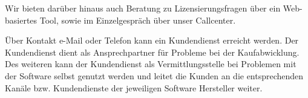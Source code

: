 Wir bieten darüber hinaus auch Beratung zu Lizensierungsfragen über ein Web-basiertes Tool, sowie im Einzelgespräch über unser Callcenter.\\ \medskip


Über Kontakt e-Mail oder Telefon kann ein Kundendienst erreicht werden. Der Kundendienst dient als Ansprechpartner für Probleme bei der Kaufabwicklung. Des weiteren kann der Kundendienst als Vermittlungsstelle bei Problemen mit der Software selbst genutzt werden und leitet die Kunden an die entsprechenden Kanäle bzw.  Kundendienste der jeweiligen Software Hersteller weiter. \\ \medskip 

